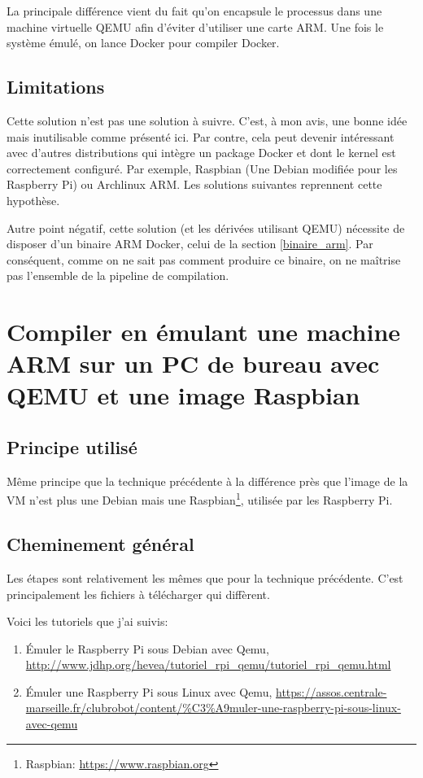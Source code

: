 \documentclass[11pt,a4paper,oneside]{report}
\begin{document}
La principale différence vient du fait qu'on encapsule le processus dans une machine virtuelle QEMU afin d'éviter d'utiliser une carte ARM. Une fois le système émulé, on lance Docker pour compiler Docker.

\subsection{Limitations}

Cette solution n'est pas une solution à suivre. C'est, à mon avis, une bonne idée mais inutilisable comme présenté ici. Par contre, cela peut devenir intéressant avec d'autres distributions qui intègre un package Docker et dont le kernel est correctement configuré. Par exemple, Raspbian (Une Debian modifiée pour les Raspberry Pi) ou Archlinux ARM. Les solutions suivantes reprennent cette hypothèse\label{hypothese_debian}.


Autre point négatif, cette solution (et les dérivées utilisant QEMU) nécessite de disposer d'un binaire ARM Docker, celui de la section \ref{binaire_arm}. Par conséquent, comme on ne sait pas comment produire ce binaire, on ne maîtrise pas l'ensemble de la pipeline de compilation.


\section{Compiler en émulant une machine ARM sur un PC de bureau avec QEMU et une image Raspbian}

\subsection{Principe utilisé}

Même principe que la technique précédente à la différence près que l'image de la VM n'est plus une Debian mais une Raspbian\footnote{Raspbian: \url{https://www.raspbian.org}}, utilisée par les Raspberry Pi.

\subsection{Cheminement général}

Les étapes sont relativement les mêmes que pour la technique précédente. C'est principalement les fichiers à télécharger qui diffèrent.

Voici les tutoriels que j'ai suivis:

\begin{enumerate}
\item Émuler le Raspberry Pi sous Debian avec Qemu, \url{http://www.jdhp.org/hevea/tutoriel_rpi_qemu/tutoriel_rpi_qemu.html}
\item Émuler une Raspberry Pi sous Linux avec Qemu, \url{https://assos.centrale-marseille.fr/clubrobot/content/%C3%A9muler-une-raspberry-pi-sous-linux-avec-qemu}
\end{enumerate}
\end{document}
